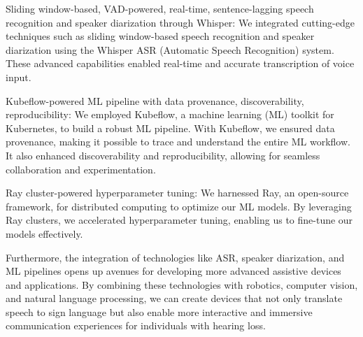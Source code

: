 Sliding window-based, VAD-powered, real-time, sentence-lagging speech recognition and speaker diarization through Whisper: We integrated cutting-edge techniques such as sliding window-based speech recognition and speaker diarization using the Whisper ASR (Automatic Speech Recognition) system. These advanced capabilities enabled real-time and accurate transcription of voice input.

Kubeflow-powered ML pipeline with data provenance, discoverability, reproducibility: We employed Kubeflow, a machine learning (ML) toolkit for Kubernetes, to build a robust ML pipeline. With Kubeflow, we ensured data provenance, making it possible to trace and understand the entire ML workflow. It also enhanced discoverability and reproducibility, allowing for seamless collaboration and experimentation.

Ray cluster-powered hyperparameter tuning: We harnessed Ray, an open-source framework, for distributed computing to optimize our ML models. By leveraging Ray clusters, we accelerated hyperparameter tuning, enabling us to fine-tune our models effectively.

Furthermore, the integration of technologies like ASR, speaker diarization, and ML pipelines opens up avenues for developing more advanced assistive devices and applications. By combining these technologies with robotics, computer vision, and natural language processing, we can create devices that not only translate speech to sign language but also enable more interactive and immersive communication experiences for individuals with hearing loss.